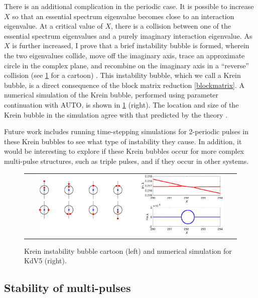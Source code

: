 \documentclass[12pt,reqno,oneside]{article}
\theoremstyle{definition}
\theoremstyle{remark}
\begin{document}
There is an additional complication in the periodic case. It is possible to increase $X$ so that an essential spectrum eigenvalue becomes close to an interaction eigenvalue. At a critical value of $X$, there is a collision between one of the essential spectrum eigenvalues and a purely imaginary interaction eigenvalue. As $X$ is further increased, I prove that a brief instability bubble is formed, wherein the two eigenvalues collide, move off the imaginary axis, trace an approximate circle in the complex plane, and recombine on the imaginary axis in a ``reverse''  collision (see \cref{fig:kreinbubble1} for a cartoon) \cite{ParkerKdV}. This instability bubble, which we call a Krein bubble, is a direct consequence of the block matrix reduction \cref{blockmatrix}. A numerical simulation of the Krein bubble, performed using parameter continuation with AUTO, is shown in \cref{fig:kreinbubble1} (right). The location and size of the Krein bubble in the simulation agree with that predicted by the theory \cite{ParkerKdV}.

Future work includes running time-stepping simulations for 2-periodic pulses in these Krein bubbles to see what type of instability they cause. In addition, it would be interesting to explore if these Krein bubbles occur for more complex multi-pulse structures, such as triple pulses, and if they occur in other systems.

\begin{figure}[H]
\begin{center}
\begin{tabular}{c}
\includegraphics[width=0.9\textwidth]{images/KreinBubbleBoth}
\end{tabular}
\end{center}
\caption{Krein instability bubble cartoon (left) and numerical simulation for KdV5 (right).}
\label{fig:kreinbubble1}
\end{figure}

\subsection{Stability of multi-pulses}
\end{document}
